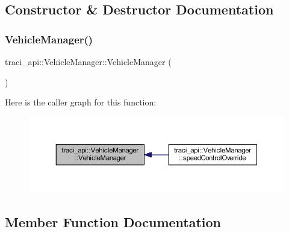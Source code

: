 \subsection{Constructor \& Destructor Documentation}
\mbox{\label{classtraci__api_1_1_vehicle_manager_a7e9e05b65776f0709f0b84a51c44377f}} 
\subsubsection{\texorpdfstring{Vehicle\+Manager()}{VehicleManager()}}
{\footnotesize\ttfamily traci\+\_\+api\+::\+Vehicle\+Manager\+::\+Vehicle\+Manager (\begin{DoxyParamCaption}\item[{\hyperlink{classtraci__api_1_1_vehicle_manager}{Vehicle\+Manager} const \&}]{ }\end{DoxyParamCaption})\hspace{0.3cm}{\ttfamily [delete]}}

Here is the caller graph for this function\+:
\nopagebreak
\begin{figure}[H]
\begin{center}
\leavevmode
\includegraphics[width=350pt]{classtraci__api_1_1_vehicle_manager_a7e9e05b65776f0709f0b84a51c44377f_icgraph}
\end{center}
\end{figure}


\subsection{Member Function Documentation}
\mbox{\label{classtraci__api_1_1_vehicle_manager_a6829e259033dcd95611755953f164ef0}} 
